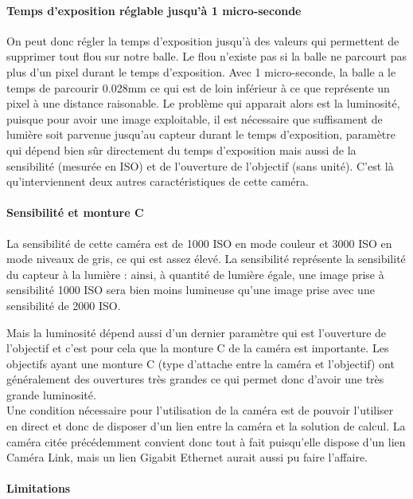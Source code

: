 \paragraph{Temps d'exposition réglable jusqu'à 1 micro-seconde\\}

On peut donc régler la temps d'exposition jusqu'à des valeurs qui permettent de supprimer tout flou sur notre balle. Le flou n'existe pas si la balle ne parcourt pas plus d'un pixel durant le temps d'exposition. Avec 1 micro-seconde, la balle a le temps de parcourir 0.028mm ce qui est de loin inférieur à ce que représente un pixel à une distance raisonable. Le problème qui apparait alors est la luminosité, puisque pour avoir une image exploitable, il est nécessaire que suffisament de lumière soit parvenue jusqu'au capteur durant le temps d'exposition, paramètre qui dépend bien sûr directement du temps d'exposition mais aussi de la sensibilité (mesurée en ISO) et de l'ouverture de l'objectif (sans unité). C'est là qu'interviennent deux autres caractéristiques de cette caméra. 

\paragraph{Sensibilité et monture C\\}

La sensibilité de cette caméra est de 1000 ISO en mode couleur et 3000 ISO en mode niveaux de gris, ce qui est assez élevé. La sensibilité représente la sensibilité du capteur à la lumière : ainsi, à quantité de lumière égale, une image prise à sensibilité 1000 ISO sera bien moins lumineuse qu'une image prise avec une sensibilité de 2000 ISO. 

Mais la luminosité dépend aussi d'un dernier paramètre qui est l'ouverture de l'objectif et c'est pour cela que la monture C de la caméra est importante. Les objectifs ayant une monture C (type d'attache entre la caméra et l'objectif) ont généralement des ouvertures très grandes ce qui permet donc d'avoir une très grande luminosité. \\


Une condition nécessaire pour l'utilisation de la caméra est de pouvoir l'utiliser en direct et donc de disposer d'un lien entre la caméra et la solution de calcul. La caméra citée précédemment convient donc tout à fait puisqu'elle dispose d'un lien Caméra Link, mais un lien Gigabit Ethernet aurait aussi pu faire l'affaire.

\paragraph{Limitations\\}

